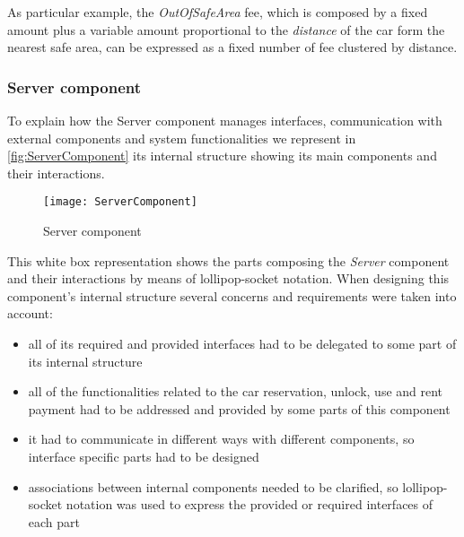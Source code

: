 As particular example, the \emph{OutOfSafeArea} fee, which is composed by a fixed amount plus a variable amount proportional to the \emph{distance} of the car form the nearest safe area, can be expressed as a fixed number of fee clustered by distance.

\subsubsection{Server component}
To explain how the Server component manages interfaces, communication with external components and system functionalities we represent in \autoref{fig:ServerComponent} its internal structure showing its main components and their interactions.
\\

\begin{figure}[h]
			\centering
			\texttt{[image: ServerComponent]}
			\caption{
				\label{fig:ServerComponent} 
				Server component
			}
		\end{figure}
\clearpage

This white box representation shows the parts composing the \emph{Server} component and their interactions by means of lollipop-socket notation. When designing this component's internal structure several concerns and requirements were taken into account:
\begin{itemize}
	\item all of its required and provided interfaces had to be delegated to some part of its internal structure
	\item all of the functionalities related to the car reservation, unlock, use and rent payment had to be addressed and provided by some parts of this component
	\item it had to communicate in different ways with different components, so interface specific parts had to be designed
	\item associations between internal components needed to be clarified, so lollipop-socket notation was used to express the provided or required interfaces of each part
\end{itemize}



